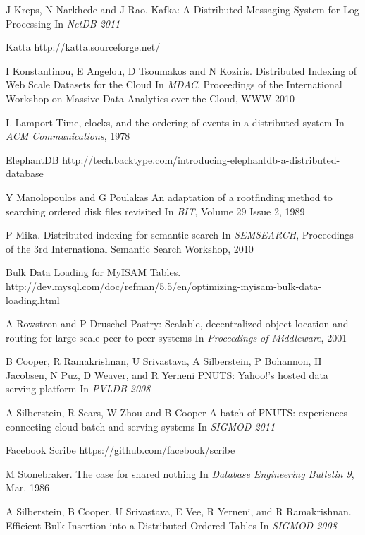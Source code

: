\documentclass[10pt,twocolumn,preprint,natbib,authoryear]{sigplanconf}
\begin{document}
\begin{thebibliography}
J Kreps, N Narkhede and J Rao.
\newblock Kafka: A Distributed Messaging System for Log Processing
\newblock In 
\emph{NetDB 2011}

Katta
\newblock http://katta.sourceforge.net/

I Konstantinou, E Angelou, D Tsoumakos and N Koziris.
\newblock Distributed Indexing of Web Scale Datasets for the Cloud
\newblock In
\emph{MDAC}, Proceedings of the International Workshop on Massive Data Analytics over the Cloud, WWW 2010

L Lamport
\newblock Time, clocks, and the ordering of events in a distributed system
\newblock In
\emph{ACM Communications}, 1978

ElephantDB
\newblock http://tech.backtype.com/introducing-elephantdb-a-distributed-database

Y Manolopoulos and G Poulakas
\newblock An adaptation of a rootfinding method to searching ordered disk files revisited
\newblock In
\emph{BIT}, Volume 29 Issue 2, 1989

P Mika.
\newblock Distributed indexing for semantic search
\newblock In
\emph{SEMSEARCH}, Proceedings of the 3rd International Semantic Search Workshop, 2010

Bulk Data Loading for MyISAM Tables.
\newblock http://dev.mysql.com/doc/refman/5.5/en/optimizing-myisam-bulk-data-loading.html

A Rowstron and P Druschel
\newblock Pastry: Scalable, decentralized object location and routing for large-scale peer-to-peer systems
\newblock In
\emph{Proceedings of Middleware}, 2001

B Cooper, R Ramakrishnan, U Srivastava, A Silberstein, P Bohannon, H Jacobsen, N Puz, D Weaver, and R 
Yerneni
\newblock PNUTS: Yahoo!'s hosted data serving platform
\newblock In
\emph{PVLDB 2008}

A Silberstein, R Sears, W Zhou and B Cooper
\newblock A batch of PNUTS: experiences connecting cloud batch and serving systems
\newblock In
\emph{SIGMOD 2011}

Facebook Scribe
\newblock https://github.com/facebook/scribe

M Stonebraker.
\newblock The case for shared nothing
\newblock In
\emph{Database Engineering Bulletin 9}, Mar. 1986

A Silberstein, B Cooper, U Srivastava, E Vee, R Yerneni, and R Ramakrishnan.
\newblock Efficient Bulk Insertion into a Distributed Ordered Tables
\newblock In
\emph{SIGMOD 2008}


\end{thebibliography}
\end{document}
